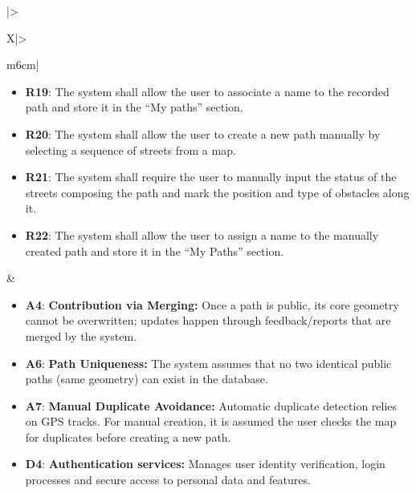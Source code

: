 \begin{table}[H]
\begin{tabularx}{\textwidth}{|>{\raggedright\arraybackslash}X|>{\raggedright\arraybackslash}m{6cm}|}
\begin{minipage}[t]{\linewidth}
\begin{itemize}[leftmargin=*, nosep, label={}]
            \item \textbf{R19}: The system shall allow the user to associate a name to the recorded path and store it in the “My paths” section.
            \item \textbf{R20}: The system shall allow the user to create a new path manually by selecting a sequence of streets from a map.
            \item \textbf{R21}: The system shall require the user to manually input the status of the streets composing the path and mark the position and type of obstacles along it.
            \item \textbf{R22}: The system shall allow the user to assign a name to the manually created path and store it in the “My Paths” section.
        \end{itemize}
        \end{minipage}
        &
        \begin{minipage}[t]{\linewidth}
        \begin{itemize}[leftmargin=*, nosep, label={}]
            \item \textbf{A4}: \textbf{Contribution via Merging:} Once a path is public, its core geometry cannot be overwritten; updates happen through feedback/reports that are merged by the system.
            \item \textbf{A6}: \textbf{Path Uniqueness:} The system assumes that no two identical public paths (same geometry) can exist in the database.
            \item \textbf{A7}: \textbf{Manual Duplicate Avoidance:} Automatic duplicate detection relies on GPS tracks. For manual creation, it is assumed the user checks the map for duplicates before creating a new path.
            \item \textbf{D4}: \textbf{Authentication services:} Manages user identity verification, login processes and secure access to personal data and features.
        \end{itemize}
        \end{minipage}
        \\ \hline
    \end{tabularx}
    \caption{Requirement Mapping for G3}
    \label{tab:mapping_g3}
\end{table}

